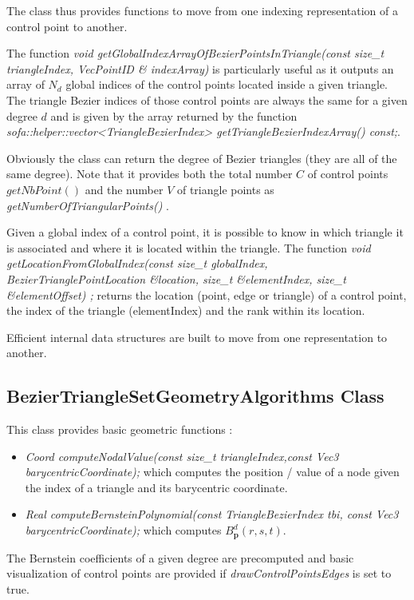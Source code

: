 \documentclass[a4paper,11pt]{article}
\newcommand{\ncontrols}{{C}}
\newcommand{\degree}{{d}}
\begin{document}
The class thus provides functions to move from one indexing representation of a control point to another.

The function {\it void getGlobalIndexArrayOfBezierPointsInTriangle(const size\_t triangleIndex, VecPointID \& indexArray) } is particularly useful as it outputs an array of $N_\degree$ global indices of the control points located inside a given triangle. The triangle  Bezier indices of those control points are always the same for a given degree $\degree$ and is given by the array returned by the function {\it sofa::helper::vector<TriangleBezierIndex> getTriangleBezierIndexArray() const;}.

Obviously the class can return the degree of  Bezier triangles  (they are all of the same degree). Note that it provides both the total number $\ncontrols$ of control points $getNbPoint()$ and the number $V$ of triangle points as {\it getNumberOfTriangularPoints() }.

Given a global index of a control point, it is possible to know in which triangle it is associated and where it is located within the triangle. 
The function {\it void getLocationFromGlobalIndex(const size\_t globalIndex, BezierTrianglePointLocation \&location, 
		size\_t \&elementIndex, size\_t \&elementOffset) ;} returns the location (point, edge or triangle) of a control point, the index of the triangle (elementIndex) and the rank within its location.
		
		
Efficient internal data structures are built to move from one representation to another.


\subsection{BezierTriangleSetGeometryAlgorithms Class}

This class provides basic geometric functions :

\begin{itemize}
	\item {\it Coord computeNodalValue(const size\_t triangleIndex,const Vec3 barycentricCoordinate); } which computes the position / value of a node given the index of a triangle and its barycentric coordinate.
	\item {\it Real computeBernsteinPolynomial(const TriangleBezierIndex tbi, const Vec3 barycentricCoordinate);} which computes $B^d_{\mathbf p}(r,s,t)$.
\end{itemize}

The Bernstein coefficients of a given degree are precomputed and basic visualization of control points are provided if {\it drawControlPointsEdges} is set to true.  
\end{document}

